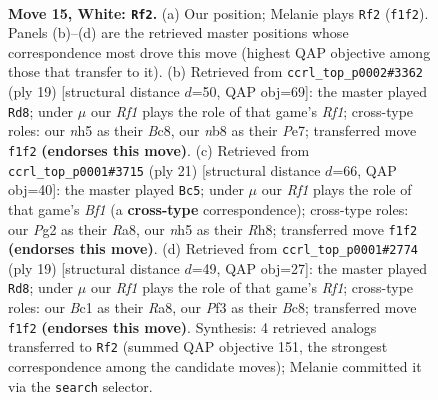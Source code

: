 \documentclass[11pt]{article}
\begin{document}
\clearpage

\begin{figure}[p]\centering
\begin{subfigure}{0.46\textwidth}\centering
\resizebox{\linewidth}{!}{%
\newchessgame
\chessboard[
  setfen={rn2bbr1/1p2k1pp/p3p3/2P2p1n/P1B5/2N1PP2/1P4PP/R1B1NRK1 w - - 0 15},
  showmover=false,
  pgfstyle=straightmove, color=movearrow, markmove={f1-f2}
]}
\caption{}
\end{subfigure}\hfill
\begin{subfigure}{0.46\textwidth}\centering
\resizebox{\linewidth}{!}{%
\newchessgame
\chessboard[
  setfen={r1b2rk1/pp2pp1p/2n2npb/2p5/4PP2/2PBBN2/PP2K1PP/RN5R b - - 8 10},
  showmover=false,
  pgfstyle=straightmove, color=movearrow, markmove={f8-d8}
]}
\caption{}
\end{subfigure}
\\[4pt]
\begin{subfigure}{0.46\textwidth}\centering
\resizebox{\linewidth}{!}{%
\newchessgame
\chessboard[
  setfen={rn2kb1r/p4ppp/b1p2n2/8/PppNPB2/5P2/1P4PP/R2NKB1R b KQkq - 2 11},
  showmover=false,
  pgfstyle=straightmove, color=movearrow, markmove={f8-c5}
]}
\caption{}
\end{subfigure}\hfill
\begin{subfigure}{0.46\textwidth}\centering
\resizebox{\linewidth}{!}{%
\newchessgame
\chessboard[
  setfen={r1b2rk1/pp2ppbp/2n3p1/2Pn4/8/5NP1/PP2PPBP/RNBR2K1 b - - 3 10},
  showmover=false,
  pgfstyle=straightmove, color=movearrow, markmove={f8-d8}
]}
\caption{}
\end{subfigure}
\caption{\textbf{Move 15, White: \texttt{Rf2}.} (a) Our position; Melanie plays \texttt{Rf2} (\texttt{f1f2}). Panels (b)--(d) are the retrieved master positions whose correspondence most drove this move (highest QAP objective among those that transfer to it). (b) Retrieved from \texttt{ccrl\_top\_p0002\#3362} (ply 19) [structural distance $d$=50, QAP obj=69]: the master played \texttt{Rd8}; under $\mu$ our \emph{Rf1} plays the role of that game's \emph{Rf1}; cross-type roles: our \emph{n}h5 as their \emph{B}c8, our \emph{n}b8 as their \emph{P}e7; transferred move \texttt{f1f2} \textbf{(endorses this move)}. (c) Retrieved from \texttt{ccrl\_top\_p0001\#3715} (ply 21) [structural distance $d$=66, QAP obj=40]: the master played \texttt{Bc5}; under $\mu$ our \emph{Rf1} plays the role of that game's \emph{Bf1} (a \textbf{cross-type} correspondence); cross-type roles: our \emph{P}g2 as their \emph{R}a8, our \emph{n}h5 as their \emph{R}h8; transferred move \texttt{f1f2} \textbf{(endorses this move)}. (d) Retrieved from \texttt{ccrl\_top\_p0001\#2774} (ply 19) [structural distance $d$=49, QAP obj=27]: the master played \texttt{Rd8}; under $\mu$ our \emph{Rf1} plays the role of that game's \emph{Rf1}; cross-type roles: our \emph{B}c1 as their \emph{R}a8, our \emph{P}f3 as their \emph{B}c8; transferred move \texttt{f1f2} \textbf{(endorses this move)}. Synthesis: 4 retrieved analogs transferred to \texttt{Rf2} (summed QAP objective 151, the strongest correspondence among the candidate moves); Melanie committed it via the \texttt{search} selector.}
\label{fig:thought-m28}
\end{figure}
\end{document}
